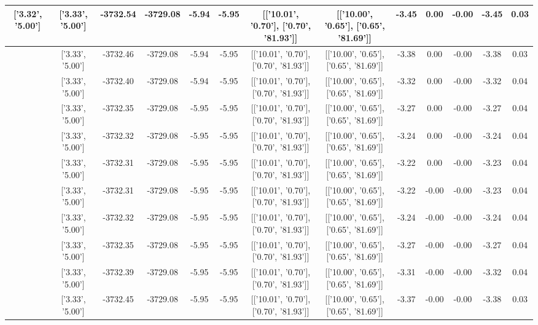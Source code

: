 \begin{table}[htbp]
\begin{adjustbox}{angle=90}
\begin{tabular}{|c|c|c|c|c|c|c|c|c|c|c|c|c|}
 ['3.32', '5.00'] & ['3.33', '5.00'] & -3732.54 & -3729.08 & -5.94 & -5.95 & [['10.01', '0.70'], ['0.70', '81.93']] & [['10.00', '0.65'], ['0.65', '81.69']] & -3.45 & 0.00 & -0.00 & -3.45 & 0.03\\ \hline
 ['3.33', '5.00'] & ['3.33', '5.00'] & -3732.46 & -3729.08 & -5.94 & -5.95 & [['10.01', '0.70'], ['0.70', '81.93']] & [['10.00', '0.65'], ['0.65', '81.69']] & -3.38 & 0.00 & -0.00 & -3.38 & 0.03\\ \hline
 ['3.33', '5.00'] & ['3.33', '5.00'] & -3732.40 & -3729.08 & -5.94 & -5.95 & [['10.01', '0.70'], ['0.70', '81.93']] & [['10.00', '0.65'], ['0.65', '81.69']] & -3.32 & 0.00 & -0.00 & -3.32 & 0.04\\ \hline
 ['3.33', '5.00'] & ['3.33', '5.00'] & -3732.35 & -3729.08 & -5.95 & -5.95 & [['10.01', '0.70'], ['0.70', '81.93']] & [['10.00', '0.65'], ['0.65', '81.69']] & -3.27 & 0.00 & -0.00 & -3.27 & 0.04\\ \hline
 ['3.33', '5.00'] & ['3.33', '5.00'] & -3732.32 & -3729.08 & -5.95 & -5.95 & [['10.01', '0.70'], ['0.70', '81.93']] & [['10.00', '0.65'], ['0.65', '81.69']] & -3.24 & 0.00 & -0.00 & -3.24 & 0.04\\ \hline
 ['3.33', '5.00'] & ['3.33', '5.00'] & -3732.31 & -3729.08 & -5.95 & -5.95 & [['10.01', '0.70'], ['0.70', '81.93']] & [['10.00', '0.65'], ['0.65', '81.69']] & -3.22 & 0.00 & -0.00 & -3.23 & 0.04\\ \hline
 ['3.33', '5.00'] & ['3.33', '5.00'] & -3732.31 & -3729.08 & -5.95 & -5.95 & [['10.01', '0.70'], ['0.70', '81.93']] & [['10.00', '0.65'], ['0.65', '81.69']] & -3.22 & -0.00 & -0.00 & -3.23 & 0.04\\ \hline
 ['3.33', '5.01'] & ['3.33', '5.00'] & -3732.32 & -3729.08 & -5.95 & -5.95 & [['10.01', '0.70'], ['0.70', '81.93']] & [['10.00', '0.65'], ['0.65', '81.69']] & -3.24 & -0.00 & -0.00 & -3.24 & 0.04\\ \hline
 ['3.33', '5.01'] & ['3.33', '5.00'] & -3732.35 & -3729.08 & -5.95 & -5.95 & [['10.01', '0.70'], ['0.70', '81.93']] & [['10.00', '0.65'], ['0.65', '81.69']] & -3.27 & -0.00 & -0.00 & -3.27 & 0.04\\ \hline
 ['3.33', '5.01'] & ['3.33', '5.00'] & -3732.39 & -3729.08 & -5.95 & -5.95 & [['10.01', '0.70'], ['0.70', '81.93']] & [['10.00', '0.65'], ['0.65', '81.69']] & -3.31 & -0.00 & -0.00 & -3.32 & 0.04\\ \hline
 ['3.34', '5.01'] & ['3.33', '5.00'] & -3732.45 & -3729.08 & -5.95 & -5.95 & [['10.01', '0.70'], ['0.70', '81.93']] & [['10.00', '0.65'], ['0.65', '81.69']] & -3.37 & -0.00 & -0.00 & -3.38 & 0.03\\ \hline

\end{tabular}
\end{adjustbox}
\end{table}
